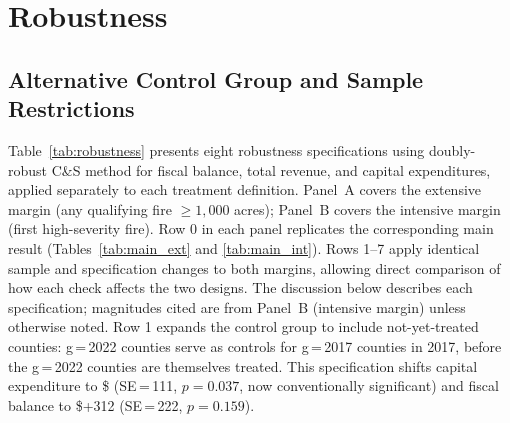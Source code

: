 \documentclass[12pt]{article}
\begin{document}
\section{Robustness}

\subsection{Alternative Control Group and Sample Restrictions}

Table~\ref{tab:robustness} presents eight robustness specifications using doubly-robust C\&S method for fiscal
balance, total revenue, and capital expenditures, applied separately to each
treatment definition. Panel~A covers the extensive margin (any qualifying fire
$\geq\!1{,}000$ acres); Panel~B covers the intensive margin (first high-severity
fire). Row 0 in each panel replicates the corresponding main result
(Tables~\ref{tab:main_ext} and \ref{tab:main_int}). Rows 1--7 apply identical
sample and specification changes to both margins, allowing direct comparison of
how each check affects the two designs. The discussion below describes each
specification; magnitudes cited are from Panel~B (intensive margin) unless
otherwise noted. Row 1 expands the control group to include not-yet-treated counties: g\,=\,2022
counties serve as controls for g\,=\,2017 counties in 2017, before the g\,=\,2022
counties are themselves treated. This specification shifts capital expenditure to
\$ (SE\,=\,111, $p = 0.037$, now conventionally significant) and fiscal
balance to \$+312 (SE\,=\,222, $p = 0.159$).
\end{document}
